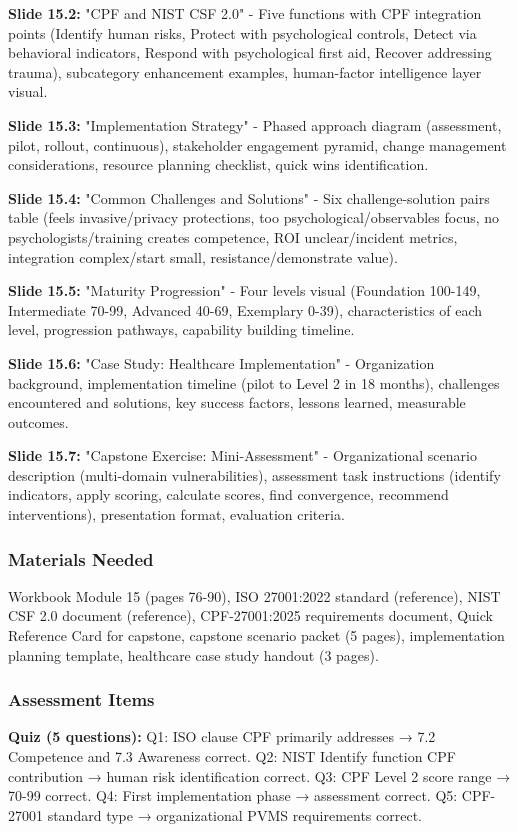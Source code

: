 \documentclass[11pt,a4paper]{article}
\begin{document}
\textbf{Slide 15.2:} "CPF and NIST CSF 2.0" - Five functions with CPF integration points (Identify human risks, Protect with psychological controls, Detect via behavioral indicators, Respond with psychological first aid, Recover addressing trauma), subcategory enhancement examples, human-factor intelligence layer visual.

\textbf{Slide 15.3:} "Implementation Strategy" - Phased approach diagram (assessment, pilot, rollout, continuous), stakeholder engagement pyramid, change management considerations, resource planning checklist, quick wins identification.

\textbf{Slide 15.4:} "Common Challenges and Solutions" - Six challenge-solution pairs table (feels invasive/privacy protections, too psychological/observables focus, no psychologists/training creates competence, ROI unclear/incident metrics, integration complex/start small, resistance/demonstrate value).

\textbf{Slide 15.5:} "Maturity Progression" - Four levels visual (Foundation 100-149, Intermediate 70-99, Advanced 40-69, Exemplary 0-39), characteristics of each level, progression pathways, capability building timeline.

\textbf{Slide 15.6:} "Case Study: Healthcare Implementation" - Organization background, implementation timeline (pilot to Level 2 in 18 months), challenges encountered and solutions, key success factors, lessons learned, measurable outcomes.

\textbf{Slide 15.7:} "Capstone Exercise: Mini-Assessment" - Organizational scenario description (multi-domain vulnerabilities), assessment task instructions (identify indicators, apply scoring, calculate scores, find convergence, recommend interventions), presentation format, evaluation criteria.

\subsubsection{Materials Needed}
Workbook Module 15 (pages 76-90), ISO 27001:2022 standard (reference), NIST CSF 2.0 document (reference), CPF-27001:2025 requirements document, Quick Reference Card for capstone, capstone scenario packet (5 pages), implementation planning template, healthcare case study handout (3 pages).

\subsubsection{Assessment Items}
\textbf{Quiz (5 questions):} Q1: ISO clause CPF primarily addresses → 7.2 Competence and 7.3 Awareness correct. Q2: NIST Identify function CPF contribution → human risk identification correct. Q3: CPF Level 2 score range → 70-99 correct. Q4: First implementation phase → assessment correct. Q5: CPF-27001 standard type → organizational PVMS requirements correct.
\end{document}
